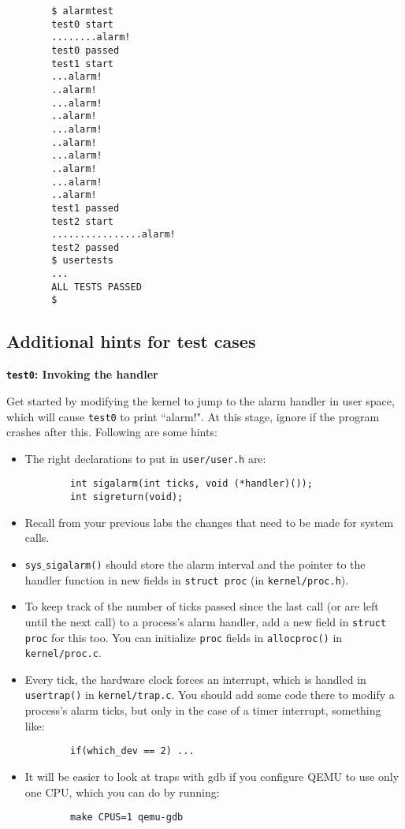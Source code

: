 \documentclass[11pt]{exam}
\begin{document}
\begin{questions}
\begin{parts}
    \begin{verbatim}
        $ alarmtest
        test0 start
        ........alarm!
        test0 passed
        test1 start
        ...alarm!
        ..alarm!
        ...alarm!
        ..alarm!
        ...alarm!
        ..alarm!
        ...alarm!
        ..alarm!
        ...alarm!
        ..alarm!
        test1 passed
        test2 start
        ................alarm!
        test2 passed
        $ usertests
        ...
        ALL TESTS PASSED
        $
    \end{verbatim}
\end{parts}

\subsection{Additional hints for test cases}

{\flushleft \bf \texttt{test0}: Invoking the handler} 

Get started by modifying the kernel to jump to the alarm handler in user space, which will cause \texttt{test0} to print ``alarm!". At this stage, ignore if the program crashes after this. Following are some hints:

\begin{itemize}
    \item The right declarations to put in \texttt{user/user.h} are:\\
    \begin{verbatim}
        int sigalarm(int ticks, void (*handler)());
        int sigreturn(void);
    \end{verbatim}
    \item Recall from your previous labs the changes that need to be made for system calls.
    \item {\tt sys$\_$sigalarm()} should store the alarm interval and the pointer to the handler function in new fields in \texttt{struct proc} (in {\tt kernel/proc.h}). 
    \item To keep track of the number of ticks passed since the last call (or are left until the next call) to a process's alarm handler, add a new field in {\tt struct proc} for this too. You can initialize \texttt{proc} fields in {\tt allocproc()} in {\tt kernel/proc.c}.
    \item Every tick, the hardware clock forces an interrupt, which is handled in {\tt usertrap()} in \texttt{kernel/trap.c}. You should add some code there to modify a process's alarm ticks, but only in the case of a timer interrupt, something like:\\
    \begin{verbatim}
        if(which_dev == 2) ...
    \end{verbatim}
    \item It will be easier to look at traps with gdb if you configure QEMU to use only one CPU, which you can do by running:\\
    \begin{verbatim}
        make CPUS=1 qemu-gdb
    \end{verbatim}
\end{itemize}


\end{questions}
\end{document}
